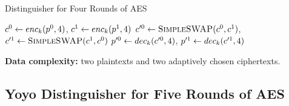 \documentclass[notheorems]{beamer}
\theoremstyle{definition}
\theoremstyle{example}
\begin{document}
    \begin{frame}{Distinguisher for Four Rounds of AES}
        \begin{algorithm}[H]
            \caption{Distinguisher for Four Rounds of AES}
            \label{alg:aes-4-rounds}
            \begin{algorithmic}[1]
                \State \(c^0 \gets enc_k(p^0, 4)\), \(c^1 \gets enc_k(p^1,
                4)\)
                \State \(c^{\prime 0} \gets \textsc{SimpleSWAP}(c^0, c^1)\),
                \(c^{\prime 1} \gets \textsc{SimpleSWAP}(c^1, c^0)\)
                \State \(p^{\prime 0} \gets dec_k(c^{\prime 0}, 4)\), \(p^{\prime
                1} \gets dec_k(c^{\prime 1}, 4)\)
                    \State {}
                \Else
                    \State {}
                \EndIf
            \end{algorithmic}
        \end{algorithm}
        \textbf{Data complexity:} two plaintexts and two adaptively chosen
        ciphertexts.
    \end{frame}

    \subsection{Yoyo Distinguisher for Five Rounds of AES}
    \label{subsec:aes-5-rounds}
\end{document}
